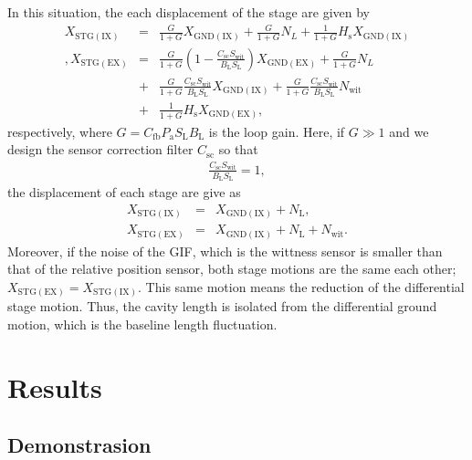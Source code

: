 In this situation, the each displacement of the stage are given by 
\begin{eqnarray}
  X_{\mathrm{STG(IX)}} &=& \displaystyle\frac{G}{1+G} X_{\mathrm{GND(IX)}} + \frac{G}{1+G} N_{L} + \frac{1}{1+G} H_{\mathrm{s}} X_{\mathrm{GND(IX)}} \\ \nonumber,
  X_{\mathrm{STG(EX)}} &=& \displaystyle\frac{G}{1+G} \left(1- \frac{C_{\mathrm{sc}}S_{\mathrm{wit}}}{B_{\mathrm{L}}S_{\mathrm{L}}}\right) X_{\mathrm{GND(EX)}} + \frac{G}{1+G}N_{L} \\ \nonumber
  &+& \frac{G}{1+G} \frac{C_{\mathrm{sc}}S_{\mathrm{wit}}} {B_{\mathrm{L}}S_{\mathrm{L}}} X_{\mathrm{GND(IX)}}
  + \frac{G}{1+G} \frac{C_{\mathrm{sc}}S_{\mathrm{wit}}} {B_{\mathrm{L}}S_{\mathrm{L}}} N_{\mathrm{wit}}\\ 
  &+& \frac{1}{1+G} H_{\mathrm{s}} X_{\mathrm{GND(EX)}},
\end{eqnarray}
respectively, where $G=C_{\mathrm{fb}}P_{\mathrm{a}}S_{\mathrm{L}}B_{\mathrm{L}}$ is the loop gain. Here, if $G\gg1$ and we design the sensor correction filter $C_{\mathrm{sc}}$ so that
\begin{eqnarray}
  \frac{C_{\mathrm{sc}}S_{\mathrm{wit}}}{B_{\mathrm{L}}S_{\mathrm{L}}} = 1,
\end{eqnarray}
the displacement of each stage are give as 
\begin{eqnarray}
  X_{\mathrm{STG(IX)}} &=& X_{\mathrm{GND(IX)}} + N_{\mathrm{L}},\\
  X_{\mathrm{STG(EX)}} &=& X_{\mathrm{GND(IX)}} + N_{\mathrm{L}} + N_{\mathrm{wit}}.
\end{eqnarray}
Moreover, if the noise of the GIF, which is the wittness sensor is smaller than that of the relative position sensor, both stage motions are the same each other; $X_{\mathrm{STG(EX)}}=X_{\mathrm{STG(IX)}}$. This same motion means the reduction of the differential stage motion. Thus, the cavity length is isolated from the differential ground motion, which is the baseline length fluctuation.




\section{Results}

\subsection{Demonstrasion}

